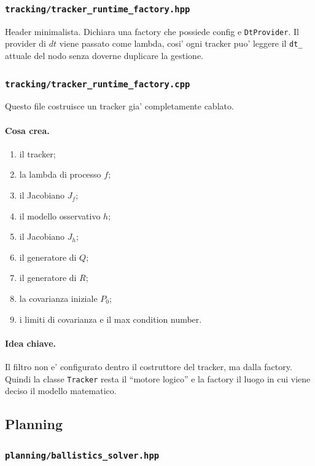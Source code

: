 \documentclass[11pt,a4paper]{article}
\newcommand{\code}[1]{\texttt{#1}}
\begin{document}
\subsubsection{\code{tracking/tracker\_runtime\_factory.hpp}}

Header minimalista. Dichiara una factory che possiede config e \code{DtProvider}. Il provider di \(dt\) viene passato come lambda, cosi' ogni tracker puo' leggere il \code{dt\_} attuale del nodo senza doverne duplicare la gestione.

\subsubsection{\code{tracking/tracker\_runtime\_factory.cpp}}

Questo file costruisce un tracker gia' completamente cablato.

\paragraph{Cosa crea.}
\begin{enumerate}[leftmargin=1.4em]
  \item il tracker;
  \item la lambda di processo \(f\);
  \item il Jacobiano \(J_f\);
  \item il modello osservativo \(h\);
  \item il Jacobiano \(J_h\);
  \item il generatore di \(Q\);
  \item il generatore di \(R\);
  \item la covarianza iniziale \(P_0\);
  \item i limiti di covarianza e il max condition number.
\end{enumerate}

\paragraph{Idea chiave.}
Il filtro non e' configurato dentro il costruttore del tracker, ma dalla factory. Quindi la classe \code{Tracker} resta il ``motore logico'' e la factory il luogo in cui viene deciso il modello matematico.

\subsection{Planning}

\subsubsection{\code{planning/ballistics\_solver.hpp}}
\end{document}
